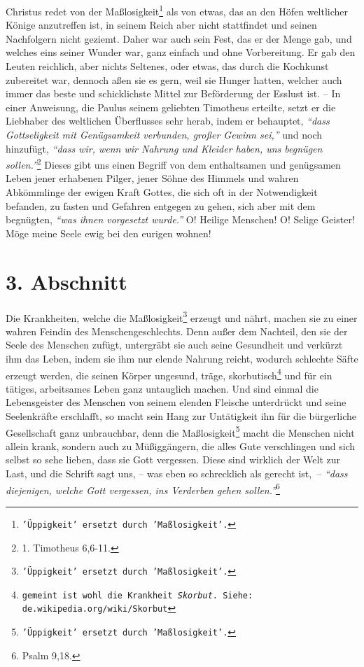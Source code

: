\medskip

Christus redet von der Maßlosigkeit\footnote{\texttt{'Üppigkeit' ersetzt durch
'Maßlosigkeit'.}} als von
etwas, das an den Höfen weltlicher
Könige anzutreffen ist, in seinem Reich aber nicht stattfindet und seinen
Nachfolgern nicht geziemt. Daher war auch sein Fest, das er der Menge gab, und
welches eins seiner Wunder war, ganz einfach und ohne Vorbereitung. Er gab den
Leuten reichlich, aber nichts Seltenes, oder etwas, das durch die
Kochkunst
zubereitet war, dennoch aßen sie es gern, weil sie Hunger hatten, welcher auch
immer das beste und schicklichste Mittel zur Beförderung der Esslust ist. -- In
einer Anweisung, die Paulus seinem geliebten Timotheus erteilte, setzt er die
Liebhaber des weltlichen Überflusses sehr herab, indem er behauptet,
\textit{"`dass Gottseligkeit mit Genügsamkeit verbunden, großer Gewinn sei,"'}
und noch
hinzufügt, \textit{"`dass wir, wenn wir Nahrung und Kleider haben, uns begnügen
sollen."'}\footnote{1. Timotheus 6,6-11.}
Dieses gibt uns einen Begriff von dem
enthaltsamen und genügsamen Leben jener erhabenen
Pilger, jener
Söhne des Himmels und wahren Abkömmlinge der
ewigen Kraft
Gottes, die sich oft in der
Notwendigkeit befanden, zu fasten und Gefahren entgegen zu gehen,
sich aber
mit dem begnügten, \textit{"`was ihnen vorgesetzt wurde."'} O! Heilige Menschen!
O!
Selige Geister! Möge meine Seele ewig bei den eurigen wohnen!

\section{3. Abschnitt} \label{kap14_ab3}

Die Krankheiten, welche die Maßlosigkeit\footnote{\texttt{'Üppigkeit' ersetzt
durch 'Maßlosigkeit'.}} erzeugt
und nährt, machen sie zu einer
wahren Feindin des Menschengeschlechts. Denn außer dem Nachteil, den sie der
Seele des Menschen zufügt, untergräbt sie auch seine
Gesundheit und verkürzt ihm
das Leben, indem sie ihm nur elende Nahrung reicht, wodurch schlechte Säfte
erzeugt werden, die seinen Körper ungesund, träge,
skorbutisch\footnote{\texttt{gemeint ist
wohl die Krankheit \textit{Skorbut}. Siehe: de.wikipedia.org/wiki/Skorbut}} und
für ein tätiges,
arbeitsames Leben ganz untauglich machen. Und sind
einmal die Lebensgeister des
Menschen von seinem elenden Fleische unterdrückt und seine Seelenkräfte
erschlafft, so macht sein Hang zur Untätigkeit ihn für die
bürgerliche Gesellschaft
 ganz unbrauchbar,
denn die Maßlosigkeit\footnote{\texttt{'Üppigkeit' ersetzt durch 'Maßlosigkeit'.}}
macht die Menschen nicht
allein krank, sondern auch zu Müßiggängern, die alles Gute
verschlingen und
sich selbst so sehe lieben, dass sie Gott vergessen. Diese sind wirklich der
Welt
zur Last, und die Schrift sagt uns, -- was eben so
schrecklich als gerecht ist,~-- \textit{"`dass diejenigen, welche Gott vergessen, ins Verderben gehen
sollen."'}\footnote{Psalm 9,18.}


